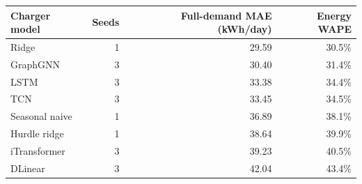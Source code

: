 \begin{tabular}{lrrr}
\toprule
Charger model & Seeds & Full-demand MAE (kWh/day) & Energy WAPE \\
\midrule
Ridge & 1 & 29.59 & 30.5\% \\
GraphGNN & 3 & 30.40 & 31.4\% \\
LSTM & 3 & 33.38 & 34.4\% \\
TCN & 3 & 33.45 & 34.5\% \\
Seasonal naive & 1 & 36.89 & 38.1\% \\
Hurdle ridge & 1 & 38.64 & 39.9\% \\
iTransformer & 3 & 39.23 & 40.5\% \\
DLinear & 3 & 42.04 & 43.4\% \\
\bottomrule
\end{tabular}
